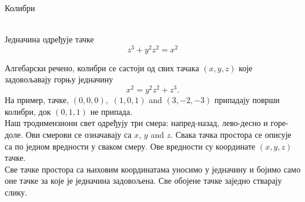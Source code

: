 \documentclass[en]{./../../common/SurferDesc}%
\begin{document}
\footnotesize

\begin{surferPage}
  \begin{surferTitle}Колибри\end{surferTitle}   \\
Једначина одређује тачке\\
  
  \smallskip
\[z^3+ y^2	z^2	= x^2\]

\singlespacing
Алгебарски речено, колибри се састоји од свих тачака  $(x, y, z)$ које задовољавају горњу једначину
\smallskip
\[ x^2= y^2z^2+z^3.\]
\smallskip
На пример, тачке, $(0,0,0),$ $(1,0,1)$ and $(3,-2,-3)$ припадају површи колибри, док $(0,1,1)$ не припада.\\
 \singlespacing
 Наш тродимензиони свет одређују три смера: напред-назад, лево-десно и горе-доле. Ови смерови се означавају са $x$, $y$ and $z$. Свака тачка простора се описује са по једном вредности у сваком смеру. Ове вредности су координате $(x,y,z)$ тачке.\\
\singlespacing
Све тачке простора са њиховим координатама  уносимо у једначину и бојимо само оне тачке за које је једначина задовољена. Све обојене тачке заједно стварају слику.\\
\singlespacing


  \begin{surferText}
     \end{surferText}
\end{surferPage}
\end{document}
